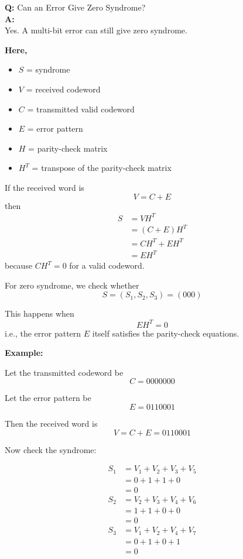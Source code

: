 \documentclass[11pt,a4paper]{book}
\newcounter{qna}[chapter]
\renewcommand{\theqna}{\thechapter.\arabic{qna}}
\newenvironment{questionanswerbox}[1][Example]{%
    \refstepcounter{qna}
    \begin{tcolorbox}[
        enhanced,
        breakable,
        colback=softlavender!10,
        colframe=softlavender!200,
        title={#1~\theqna},
        fonttitle=\bfseries,
        coltitle=white,
        colbacktitle=softlavender!200,
        sharp corners,
        boxrule=1pt,
        left=8pt,
        right=8pt,
        top=6pt,
        bottom=6pt
    ]
}{\end{tcolorbox}}
\begin{document}
\begin{questionanswerbox}
\textbf{Q: } Can an Error Give Zero Syndrome?\\
\textbf{A: } \\
Yes. A multi-bit error can still give zero syndrome.

\textbf{Here,}
\begin{itemize}
    \item \(S\) = syndrome
    \item \(V\) = received codeword
    \item \(C\) = transmitted valid codeword
    \item \(E\) = error pattern
    \item \(H\) = parity-check matrix
    \item \(H^T\) = transpose of the parity-check matrix
\end{itemize}

If the received word is
\[
V=C+E
\]
then
\begin{align*}
S &= VH^T\\
  &= (C+E)H^T\\
  &= CH^T+EH^T\\
  &= EH^T
\end{align*}
because \(CH^T=0\) for a valid codeword.

For zero syndrome, we check whether
\[
S=(S_1,S_2,S_3)=(000)
\]

This happens when
\[
EH^T = 0
\]
i.e., the error pattern \(E\) itself satisfies the parity-check equations.
\par\vspace{\baselineskip}
\textbf{Example:}

Let the transmitted codeword be
\[
C=0000000
\]

Let the error pattern be
\[
E=0110001
\]

Then the received word is
\[
V=C+E=0110001
\]

Now check the syndrome:

\begin{align*}
S_1 &= V_1+V_2+V_3+V_5 \\
    &= 0+1+1+0 \\
    &= 0 \\
S_2 &= V_2+V_3+V_4+V_6 \\
    &= 1+1+0+0 \\
    &= 0 \\
S_3 &= V_1+V_2+V_4+V_7 \\
    &= 0+1+0+1 \\
    &= 0
\end{align*}


\end{questionanswerbox}
\end{document}
